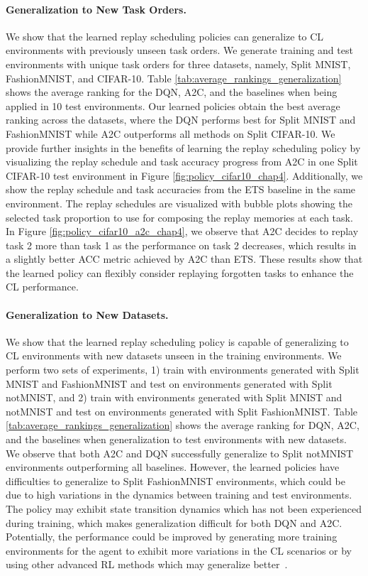 \paragraph{Generalization to New Task Orders.} 
We show that the learned replay scheduling policies can generalize to CL environments with previously unseen task orders. We generate training and test environments with unique task orders for three datasets, namely, Split MNIST, FashionMNIST, and CIFAR-10. Table \ref{tab:average_rankings_generalization} shows the average ranking for the DQN, A2C, and the baselines when being applied in 10 test environments. 
Our learned policies obtain the best average ranking across the datasets, where the DQN performs best for Split MNIST and FashionMNIST while A2C outperforms all methods on Split CIFAR-10. 
We provide further insights in the benefits of learning the replay scheduling policy by visualizing the replay schedule and task accuracy progress from A2C in one Split CIFAR-10 test environment in Figure \ref{fig:policy_cifar10_chap4}. Additionally, we show the replay schedule and task accuracies from the ETS baseline in the same environment. The replay schedules are visualized with bubble plots showing the selected task proportion to use for composing the replay memories at each task. In Figure \ref{fig:policy_cifar10_a2c_chap4}, we observe that A2C decides to replay task 2 more than task 1 as the performance on task 2 decreases, which results in a slightly better ACC metric achieved by A2C than ETS. These results show that the learned policy can flexibly consider replaying forgotten tasks to enhance the CL performance.


\vspace{-3mm}
\paragraph{Generalization to New Datasets.}
We show that the learned replay scheduling policy is capable of generalizing to CL environments with new datasets unseen in the training environments. We perform two sets of experiments, 1) train with environments generated with Split MNIST and FashionMNIST and test on environments generated with Split notMNIST, and 2) train with environments generated with Split MNIST and notMNIST and test on environments generated with Split FashionMNIST.
Table \ref{tab:average_rankings_generalization} shows the average ranking for DQN, A2C, and the baselines when generalization to test environments with new datasets. We observe that both A2C and DQN successfully generalize to Split notMNIST environments outperforming all baselines. However, the learned policies have difficulties to generalize to Split FashionMNIST environments, which could be due to high variations in the dynamics between training and test environments. 
The policy may exhibit state transition dynamics which has not been experienced during training, which makes generalization difficult for both DQN and A2C.
Potentially, the performance could be improved by generating more training environments for the agent to exhibit more variations in the CL scenarios or by using other advanced RL methods which may generalize better~\cite{igl2019generalization}.


